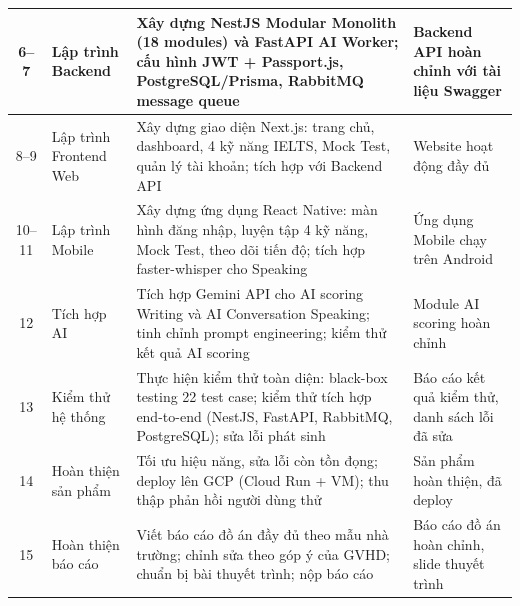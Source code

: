 \begin{longtable}{|c|p{40\tbu}|p{55\tbu}|p{35\tbu}|}
    6--7 & Lập trình Backend & Xây dựng NestJS Modular Monolith (18 modules) và FastAPI AI Worker; cấu hình JWT + Passport.js, PostgreSQL/Prisma, RabbitMQ message queue & Backend API hoàn chỉnh với tài liệu Swagger \\ \hline
    8--9 & Lập trình Frontend Web & Xây dựng giao diện Next.js: trang chủ, dashboard, 4 kỹ năng IELTS, Mock Test, quản lý tài khoản; tích hợp với Backend API & Website hoạt động đầy đủ \\ \hline
    10--11 & Lập trình Mobile & Xây dựng ứng dụng React Native: màn hình đăng nhập, luyện tập 4 kỹ năng, Mock Test, theo dõi tiến độ; tích hợp faster-whisper cho Speaking & Ứng dụng Mobile chạy trên Android \\ \hline
    12 & Tích hợp AI & Tích hợp Gemini API cho AI scoring Writing và AI Conversation Speaking; tinh chỉnh prompt engineering; kiểm thử kết quả AI scoring & Module AI scoring hoàn chỉnh \\ \hline
    13 & Kiểm thử hệ thống & Thực hiện kiểm thử toàn diện: black-box testing 22 test case; kiểm thử tích hợp end-to-end (NestJS, FastAPI, RabbitMQ, PostgreSQL); sửa lỗi phát sinh & Báo cáo kết quả kiểm thử, danh sách lỗi đã sửa \\ \hline
    14 & Hoàn thiện sản phẩm & Tối ưu hiệu năng, sửa lỗi còn tồn đọng; deploy lên GCP (Cloud Run + VM); thu thập phản hồi người dùng thử & Sản phẩm hoàn thiện, đã deploy \\ \hline
    15 & Hoàn thiện báo cáo & Viết báo cáo đồ án đầy đủ theo mẫu nhà trường; chỉnh sửa theo góp ý của GVHD; chuẩn bị bài thuyết trình; nộp báo cáo & Báo cáo đồ án hoàn chỉnh, slide thuyết trình \\ \hline
\end{longtable}

